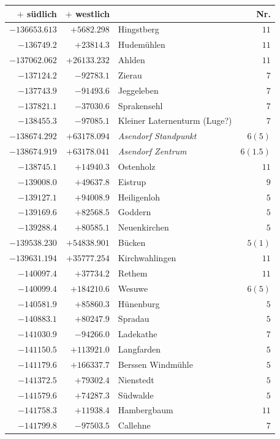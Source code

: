 \begin{center}\begingroup\fontsize{8}{9}\selectfont
\setlength{\tabcolsep}{4pt}
\begin{tabular}{r|r|p{170pt}|r}\hline
\(+\) südlich&\(+\) westlich&&Nr.\\\hline
\(-136653.613\)&\(+5682.298\)&Hingstberg&\(11\)\\
\(-136749.2\)&\(+23814.3\)&Hudemühlen&\(11\)\\
\(-137062.062\)&\(+26133.232\)&Ahlden&\(11\)\\
\(-137124.2\)&\(-92783.1\)&Zierau&\(7\)\\
\(-137743.9\)&\(-91493.6\)&Jeggeleben&\(7\)\\
\(-137821.1\)&\(-37030.6\)&Sprakensehl&\(7\)\\
\(-138455.3\)&\(-97085.1\)&Kleiner Laternenturm (Luge?)&\(7\)\\
\(-138674.292\)&\(+63178.094\)&\textit{Asendorf Standpunkt}&\(6 (5)\)\\
\(-138674.919\)&\(+63178.041\)&\textit{Asendorf Zentrum}&\(6(1.5)\)\\
\(-138745.1\)&\(+14940.3\)&Ostenholz&\(11\)\\
\(-139008.0\)&\(+49637.8\)&Eistrup&\(9\)\\
\(-139127.1\)&\(+94008.9\)&Heiligenloh&\(5\)\\
\(-139169.6\)&\(+82568.5\)&Goddern&\(5\)\\
\(-139288.4\)&\(+80585.1\)&Neuenkirchen&\(5\)\\
\(-139538.230\)&\(+54838.901\)&Bücken&\(5 (1)\)\\
\(-139631.194\)&\(+35777.254\)&Kirchwahlingen&\(11\)\\
\(-140097.4\)&\(+37734.2\)&Rethem&\(11\)\\
\(-140099.4\)&\(+184210.6\)&Wesuwe&\(6 (5)\)\\
\(-140581.9\)&\(+85860.3\)&Hünenburg&\(5\)\\
\(-140883.1\)&\(+80247.9\)&Spradau&\(5\)\\
\(-141030.9\)&\(-94266.0\)&Ladekathe&\(7\)\\
\(-141150.5\)&\(+113921.0\)&Langfarden&\(5\)\\
\(-141179.6\)&\(+166337.7\)&Berssen Windmühle&\(5\)\\
\(-141372.5\)&\(+79302.4\)&Nienstedt&\(5\)\\
\(-141579.6\)&\(+74287.3\)&Südwalde&\(5\)\\
\(-141758.3\)&\(+11938.4\)&Hambergbaum&\(11\)\\
\(-141799.8\)&\(-97503.5\)&Callehne&\(7\)\\

\end{tabular}
\end{center}
